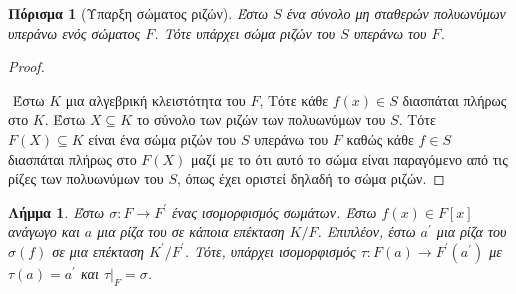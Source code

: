 \documentclass[oneside,a4paper]{article}
\newtheorem{lemma}{Λήμμα}
\newtheorem{cor}{Πόρισμα}
\begin{document}
\vspace{0.1cm}
\begin{cor}[Υπαρξη σώματος ριζών]
	Έστω $S$ ένα σύνολο μη σταθερών πολυωνύμων υπεράνω ενός σώματος $F$. Τότε υπάρχει σώμα ριζών του $S$ υπεράνω του $F$.
\end{cor}

\begin{proof} $ $

	$ $\newline
	Έστω $K$ μια αλγεβρική κλειστότητα του $F$, Τότε κάθε $f(x) \in S$ διασπάται πλήρως στο $K$. Έστω $X\subseteq K$ το σύνολο των ριζών των πολυωνύμων του $S$. Τότε $F(X) \subseteq K$ είναι ένα σώμα ριζών του $S$ υπεράνω του $F$ καθώς κάθε $f \in S$ διασπάται πλήρως στο $F(X)$ μαζί με το ότι αυτό το σώμα είναι παραγόμενο από τις ρίζες των πολυωνύμων του $S$, όπως έχει οριστεί δηλαδή το σώμα ριζών.
\end{proof}
\vspace{0.1cm}
\begin{lemma} Έστω $\sigma : F \rightarrow F^{\prime}$ ένας ισομορφισμός σωμάτων. Έστω $f(x) \in F[x]$ ανάγωγο και $a$ μια ρίζα του σε κάποια επέκταση $K/F$. Επιπλέον, έστω $a^{\prime}$ μια ρίζα του $\sigma(f)$ σε μια επέκταση $K^{\prime} / F^{\prime}$. Τότε, υπάρχει ισομορφισμός $\tau : F(a) \rightarrow F^{\prime} ( a ^{\prime})$ με $\tau (a) = a^{\prime}$ και $\tau|_F = \sigma$.
\label{3.17}
\end{lemma}
\end{document}
